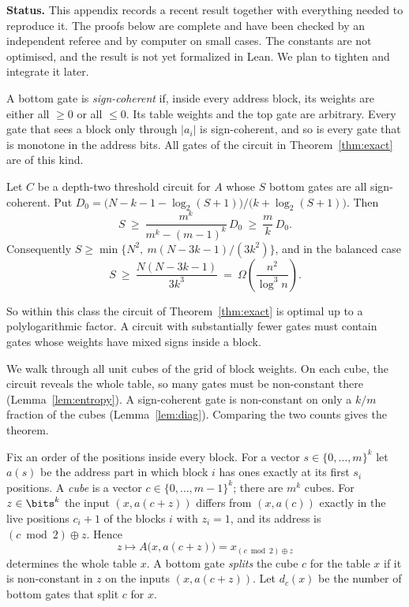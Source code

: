 \label{app:coherent}

\begin{keybox}
\textbf{Status.} This appendix records a recent result together with
everything needed to reproduce it. The proofs below are complete and have
been checked by an independent referee and by computer on small cases. The
constants are not optimised, and the result is not yet formalized in Lean.
We plan to tighten and integrate it later.
\end{keybox}

A bottom gate is \emph{sign-coherent} if, inside every address block, its
weights are either all $\ge0$ or all $\le0$. Its table weights and the top
gate are arbitrary. Every gate that sees a block only through $|a_i|$ is
sign-coherent, and so is every gate that is monotone in the address bits.
All gates of the circuit in Theorem~\ref{thm:exact} are of this kind.

\begin{theorem}\label{thm:coherent}
Let $C$ be a depth-two threshold circuit for $A$ whose $S$ bottom gates are
all sign-coherent. Put $D_0=\bigl(N-k-1-\log_2(S+1)\bigr)/\bigl(k+\log_2(S+1)\bigr)$. Then
\[
S\ \ge\ \frac{m^k}{m^k-(m-1)^k}\,D_0\ \ge\ \frac mk\,D_0 .
\]
Consequently $S\ge\min\{N^2,\ m(N-3k-1)/(3k^2)\}$, and in the balanced case
\[
S\ \ge\ \frac{N(N-3k-1)}{3k^3}\ =\ \Omega\!\left(\frac{n^2}{\log^3 n}\right).
\]
\end{theorem}

So within this class the circuit of Theorem~\ref{thm:exact} is optimal up to a
polylogarithmic factor. A circuit with substantially fewer gates must contain
gates whose weights have mixed signs inside a block.

We walk through all unit cubes of the grid of block weights. On each cube,
the circuit reveals the whole table, so many gates must be non-constant there
(Lemma~\ref{lem:entropy}). A sign-coherent gate is non-constant on only a
$k/m$ fraction of the cubes (Lemma~\ref{lem:diag}). Comparing the two counts
gives the theorem.

Fix an order of the positions inside every block. For a vector
$s\in\{0,\dots,m\}^k$ let $a(s)$ be the address part in which block $i$ has
ones exactly at its first $s_i$ positions. A \emph{cube} is a vector
$c\in\{0,\dots,m-1\}^k$; there are $m^k$ cubes. For $z\in\bits^k$ the input
$(x,a(c+z))$ differs from $(x,a(c))$ exactly in the live positions
$c_i+1$ of the blocks $i$ with $z_i=1$, and its address is
$(c\bmod2)\oplus z$. Hence
\[
z\mapsto A\bigl(x,a(c+z)\bigr)=x_{(c\bmod 2)\oplus z}
\]
determines the whole table $x$. A bottom gate \emph{splits} the cube $c$ for
the table $x$ if it is non-constant in $z$ on the inputs $(x,a(c+z))$. Let
$d_c(x)$ be the number of bottom gates that split $c$ for $x$.

